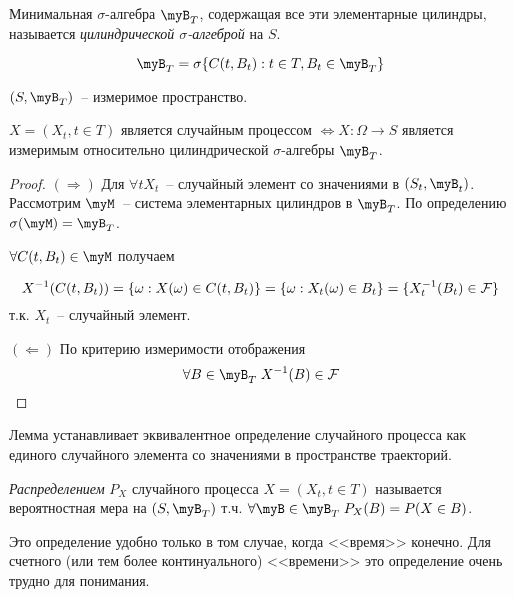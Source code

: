 \begin{definition}
Минимальная $\sigma$-алгебра $\myB_T$, содержащая все эти элементарные цилиндры,
называется \emph{цилиндрической $\sigma$-алгеброй} на $S$.

$$\myB_T = \sigma\{C(t, B_t): t \in T, B_t \in \myB_T\}$$
\end{definition}

$(S, \myB_T)$~-- измеримое пространство.

\begin{lem}
$X = (X_t, t \in T)$ является случайным процессом $\Leftrightarrow X: \Omega \to S$
является измеримым относительно цилиндрической $\sigma$-алгебры $\myB_T$.
\end{lem}


\begin{proof}

$(\Rightarrow)$ Для $\forall t X_t$~-- случайный элемент со значениями в $(S_t, \myB_t)$. Рассмотрим 
$\myM$~-- система элементарных цилиндров в $\myB_T$. По определению $\sigma(\myM) = \myB_T$.

$\forall C(t, B_t) \in \myM$ получаем 

$$X^{-1}(C(t, B_t)) = \{\omega:  X(\omega) \in C(t, B_t)\}
= \{\omega: X_t(\omega) \in B_t \} = \{X_t^{-1}(B_t) \in \mathcal{F}\}$$
т.к. $X_t$~-- случайный элемент.

$(\Leftarrow)$ По критерию измеримости отображения
$$\forall B \in \myB_T \; X^{-1}(B) \in \myF$$
\end{proof}

\begin{remark}
Лемма устанавливает эквивалентное определение случайного процесса как единого случайного
элемента со значениями в пространстве траекторий.
\end{remark}

\begin{definition}
\emph{Распределением} $P_X$ случайного процесса $X =  (X_t, t \in T)$
называется вероятностная мера на $(S, \myB_T)$
т.ч. $\forall \myB \in \myB_T \; P_X(B) =  P(X \in B)$.
\end{definition}

Это определение удобно только в том случае, когда <<время>> конечно.
Для счетного (или тем более континуального) <<времени>> это определение
очень трудно для понимания.

